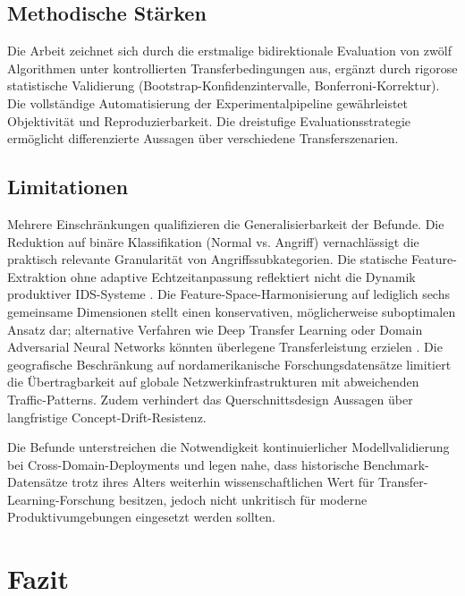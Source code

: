 \documentclass[11pt,a4paper]{article}
\begin{document}
    \subsection{Methodische Stärken}

    Die Arbeit zeichnet sich durch die erstmalige bidirektionale Evaluation von zwölf Algorithmen unter kontrollierten Transferbedingungen aus, ergänzt durch rigorose statistische Validierung (Bootstrap-Konfidenzintervalle, Bonferroni-Korrektur). Die vollständige Automatisierung der Experimentalpipeline gewährleistet Objektivität und Reproduzierbarkeit. Die dreistufige Evaluationsstrategie ermöglicht differenzierte Aussagen über verschiedene Transferszenarien.

    \subsection{Limitationen}

    Mehrere Einschränkungen qualifizieren die Generalisierbarkeit der Befunde. Die Reduktion auf binäre Klassifikation (Normal vs. Angriff) vernachlässigt die praktisch relevante Granularität von Angriffssubkategorien. Die statische Feature-Extraktion ohne adaptive Echtzeitanpassung reflektiert nicht die Dynamik produktiver IDS-Systeme \parencite{Vinayakumar2019}. Die Feature-Space-Harmonisierung auf lediglich sechs gemeinsame Dimensionen stellt einen konservativen, möglicherweise suboptimalen Ansatz dar; alternative Verfahren wie Deep Transfer Learning oder Domain Adversarial Neural Networks könnten überlegene Transferleistung erzielen \parencite{Goodfellow2016}. Die geografische Beschränkung auf nordamerikanische Forschungsdatensätze limitiert die Übertragbarkeit auf globale Netzwerkinfrastrukturen mit abweichenden Traffic-Patterns. Zudem verhindert das Querschnittsdesign Aussagen über langfristige Concept-Drift-Resistenz.

    Die Befunde unterstreichen die Notwendigkeit kontinuierlicher Modellvalidierung bei Cross-Domain-Deployments und legen nahe, dass historische Benchmark-Datensätze trotz ihres Alters weiterhin wissenschaftlichen Wert für Transfer-Learning-Forschung besitzen, jedoch nicht unkritisch für moderne Produktivumgebungen eingesetzt werden sollten.

    \clearpage

    \section{Fazit}
\end{document}

